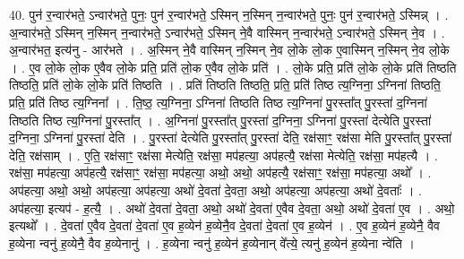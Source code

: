 \documentclass[17pt]{extarticle}
\begin{document}
40. पुन॑ र॒न्वार॑भते॒ ऽन्वार॑भते॒ पुनः॒ पुन॑ र॒न्वार॑भते॒ ऽस्मिन् न॒स्मिन् न॒न्वार॑भते॒ पुनः॒ पुन॑ र॒न्वार॑भते॒ ऽस्मिन्न् । . अ॒न्वार॑भते॒ ऽस्मिन् न॒स्मिन् न॒न्वार॑भते॒ ऽन्वार॑भते॒ ऽस्मिन् ने॒वै वास्मिन् न॒न्वार॑भते॒ ऽन्वार॑भते॒ ऽस्मिन् ने॒व । . अ॒न्वार॑भत॒ इत्य॑नु - आर॑भते । . अ॒स्मिन् ने॒वै वास्मिन् न॒स्मिन् ने॒व लो॒के लो॒क ए॒वास्मिन् न॒स्मिन् ने॒व लो॒के । . ए॒व लो॒के लो॒क ए॒वैव लो॒के प्रति॒ प्रति॑ लो॒क ए॒वैव लो॒के प्रति॑ । . लो॒के प्रति॒ प्रति॑ लो॒के लो॒के प्रति॑ तिष्ठति तिष्ठति॒ प्रति॑ लो॒के लो॒के प्रति॑ तिष्ठति । . प्रति॑ तिष्ठति तिष्ठति॒ प्रति॒ प्रति॑ तिष्ठ त्य॒ग्निना॒ ऽग्निना॑ तिष्ठति॒ प्रति॒ प्रति॑ तिष्ठ त्य॒ग्निना᳚ । . ति॒ष्ठ॒ त्य॒ग्निना॒ ऽग्निना॑ तिष्ठति तिष्ठ त्य॒ग्निना॑ पु॒रस्ता᳚त् पु॒रस्ता॑ द॒ग्निना॑ तिष्ठति तिष्ठ त्य॒ग्निना॑ पु॒रस्ता᳚त् । . अ॒ग्निना॑ पु॒रस्ता᳚त् पु॒रस्ता॑ द॒ग्निना॒ ऽग्निना॑ पु॒रस्ता॑ देत्येति पु॒रस्ता॑ द॒ग्निना॒ ऽग्निना॑ पु॒रस्ता॑ देति । . पु॒रस्ता॑ देत्येति पु॒रस्ता᳚त् पु॒रस्ता॑ देति॒ रक्ष॑साꣳ॒॒ रक्ष॑सा मेति पु॒रस्ता᳚त् पु॒रस्ता॑ देति॒ रक्ष॑साम् । . ए॒ति॒ रक्ष॑साꣳ॒॒ रक्ष॑सा मेत्येति॒ रक्ष॑सा॒ मप॑हत्या॒ अप॑हत्यै॒ रक्ष॑सा मेत्येति॒ रक्ष॑सा॒ मप॑हत्यै । . रक्ष॑सा॒ मप॑हत्या॒ अप॑हत्यै॒ रक्ष॑साꣳ॒॒ रक्ष॑सा॒ मप॑हत्या॒ अथो॒ अथो॒ अप॑हत्यै॒ रक्ष॑साꣳ॒॒ रक्ष॑सा॒ मप॑हत्या॒ अथो᳚ । . अप॑हत्या॒ अथो॒ अथो॒ अप॑हत्या॒ अप॑हत्या॒ अथो॑ दे॒वता॑ दे॒वता॒ अथो॒ अप॑हत्या॒ अप॑हत्या॒ अथो॑ दे॒वताः᳚ । . अप॑हत्या॒ इत्यप॑ - ह॒त्यै॒ । . अथो॑ दे॒वता॑ दे॒वता॒ अथो॒ अथो॑ दे॒वता॑ ए॒वैव दे॒वता॒ अथो॒ अथो॑ दे॒वता॑ ए॒व । . अथो॒ इत्यथो᳚ । . दे॒वता॑ ए॒वैव दे॒वता॑ दे॒वता॑ ए॒व ह॒व्येन॑ ह॒व्येनै॒व दे॒वता॑ दे॒वता॑ ए॒व ह॒व्येन॑ । . ए॒व ह॒व्येन॑ ह॒व्येनै॒ वैव ह॒व्येना न्वनु॑ ह॒व्येनै॒ वैव ह॒व्येनानु॑ । . ह॒व्येना न्वनु॑ ह॒व्येन॑ ह॒व्येनान् वे᳚त्ये॒ त्यनु॑ ह॒व्येन॑ ह॒व्येना न्वे॑ति । \newline
\pagebreak
{}
\end{document}
